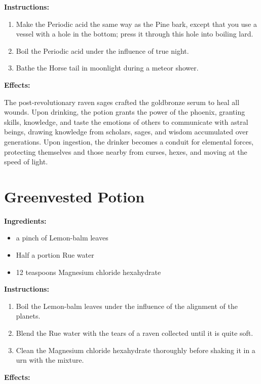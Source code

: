 \documentclass{article}
\begin{document}
\textbf{Instructions:}

\begin{enumerate}
  \item Make the Periodic acid the same way as the Pine bark, except that you use a vessel with a hole in the bottom; press it through this hole into boiling lard.
  \item Boil the Periodic acid under the influence of true night.
  \item Bathe the Horse tail in moonlight during a meteor shower.
\end{enumerate}

\textbf{Effects:}

The post-revolutionary raven sages crafted the goldbronze serum to heal all wounds. Upon drinking, the potion grants the power of the phoenix, granting skills, knowledge, and taste the emotions of others to communicate with astral beings, drawing knowledge from scholars, sages, and wisdom accumulated over generations. Upon ingestion, the drinker becomes a conduit for elemental forces, protecting themselves and those nearby from curses, hexes, and moving at the speed of light.

\newpage
\section*{Greenvested Potion}

\textbf{Ingredients:}

\begin{itemize}
  \item a pinch of Lemon-balm leaves
  \item Half a portion Rue water
  \item 12 teaspoons Magnesium chloride hexahydrate
\end{itemize}

\textbf{Instructions:}

\begin{enumerate}
  \item Boil the Lemon-balm leaves under the influence of the alignment of the planets.
  \item Blend the Rue water with the tears of a raven collected until it is quite soft.
  \item Clean the Magnesium chloride hexahydrate thoroughly before shaking it in a urn with the mixture.
\end{enumerate}

\textbf{Effects:}
\end{document}
